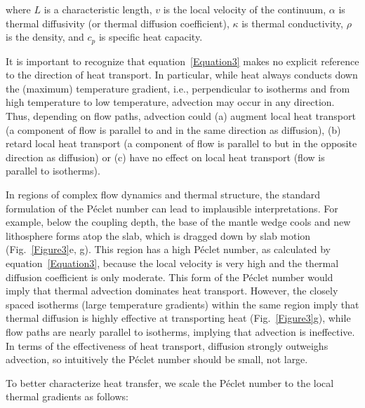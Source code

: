 \documentclass[draft,linenumbers]{agujournal2018} %
\providecommand{\DIFdeltex}[1]{{\protect\color{red} \scriptsize #1}} %
\providecommand{\DIFdelbegin}{} %
\providecommand{\DIFdel}[1]{\texorpdfstring{\DIFdeltex{#1}}{}} %
\newcommand{\DIFscaledelfig}{0.3}
\newlength{\DIFdelgraphicswidth} %
\newlength{\DIFdelgraphicsheight} %
\newcommand{\DIFdelincludegraphics}[2][]{%
\sbox{\DIFdelgraphicsbox}{\DIFOincludegraphics[#1]{#2}}%
\settoboxwidth{\DIFdelgraphicswidth}{\DIFdelgraphicsbox} %
\settoboxtotalheight{\DIFdelgraphicsheight}{\DIFdelgraphicsbox} %
\scalebox{\DIFscaledelfig}{%
\parbox[b]{\DIFdelgraphicswidth}{\usebox{\DIFdelgraphicsbox}\\[-\baselineskip] \rule{\DIFdelgraphicswidth}{0em}}\llap{\resizebox{\DIFdelgraphicswidth}{\DIFdelgraphicsheight}{%
\setlength{\unitlength}{\DIFdelgraphicswidth}%
\begin{picture}(1,1)%
\thicklines\linethickness{2pt} %
{\color[rgb]{1,0,0}\put(0,0){\framebox(1,1){}}}%
{\color[rgb]{1,0,0}\put(0,0){\line( 1,1){1}}}%
{\color[rgb]{1,0,0}\put(0,1){\line(1,-1){1}}}%
\end{picture}%
}\hspace*{3pt}}} %
} %
\DeclareRobustCommand{\DIFdelbegin}{\DIFOdelbegin \let\includegraphics\DIFdelincludegraphics} %
\begin{document}
\DIFdelbegin \DIFdel{where $L$ is a characteristic length, $v$ is the local velocity of the continuum, $\alpha$ is thermal diffusivity (or thermal diffusion coefficient), $\kappa$ is thermal conductivity, $\rho$ is the density, and $c_p$ is specific heat capacity.
}%

\DIFdel{It is important to recognize that equation~\ref{Equation3} makes no explicit reference to the direction of heat transport. In particular, while heat always conducts down the (maximum) temperature gradient, i.e., perpendicular to isotherms and from high temperature to low temperature, advection may occur in any direction. Thus, depending on flow paths, advection could (a) augment local heat transport (a component of flow is parallel to and in the same direction as diffusion), (b) retard local heat transport (a component of flow is parallel to but in the opposite direction as diffusion) or (c) have no effect on local heat transport (flow is parallel to isotherms).
}%

\DIFdel{In regions of complex flow dynamics and thermal structure, the standard formulation of the P\'{e}clet number can lead to implausible interpretations. For example, below the coupling depth, the base of the mantle wedge cools and new lithosphere forms atop the slab, which is dragged down by slab motion (Fig.~\ref{Figure3}e, g). This region has a high P\'{e}clet number, as calculated by equation~\ref{Equation3}, because the local velocity is very high and the thermal diffusion coefficient is only moderate. This form of the P\'{e}clet number would imply that thermal advection dominates heat transport. However, the closely spaced isotherms (large temperature gradients) within the same region imply that thermal diffusion is highly effective at transporting heat (Fig.~\ref{Figure3}g), while flow paths are nearly parallel to isotherms, implying that advection is ineffective. In terms of the effectiveness of heat transport, diffusion strongly outweighs advection, so intuitively the P\'{e}clet number should be small, not large.
}%

\DIFdel{To better characterize heat transfer, we scale the P\'{e}clet number to the local thermal gradients as follows:
}%

\end{document}
